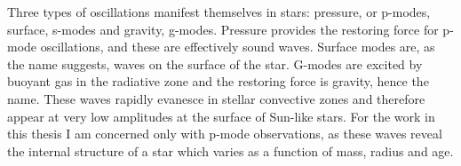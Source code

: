 Three types of oscillations manifest themselves in stars: pressure, or p-modes,
surface, s-modes and gravity, g-modes.
Pressure provides the restoring force for p-mode oscillations, and these are
effectively sound waves.
Surface modes are, as the name suggests, waves on the surface of the star.
G-modes are excited by buoyant gas in the radiative zone and the restoring
force is gravity, hence the name.
These waves rapidly evanesce in stellar convective zones and therefore
appear at very low amplitudes at the surface of Sun-like stars.
For the work in this thesis I am concerned only with p-mode observations, as
these waves reveal the internal structure of a star which varies as a function
of mass, radius and age.

